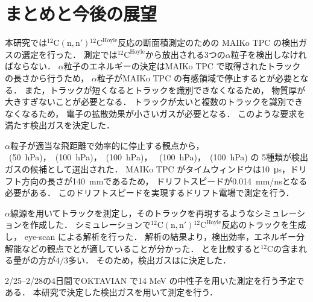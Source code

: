 \documentclass[../master]{subfiles}
\begin{document}
\chapter{まとめと今後の展望}
本研究では${}^{12}\mathrm{C}(\mathrm{n}, \mathrm{n}'){}^{12}\mathrm{C}^{\text{Hoyle}}$反応の断面積測定のための
MAIKo TPC の検出ガスの選定を行った．
測定では${}^{12}\mathrm{C}^{\text{Hoyle}}$から放出される3つの$\alpha$粒子を検出しなければならない．
$\alpha$粒子のエネルギーの決定はMAIKo TPC で取得されたトラックの長さから行うため，
$\alpha$粒子がMAIKo TPC の有感領域で停止するとが必要となる．
また，トラックが短くなるとトラックを識別できなくなるため，
物質厚が大きすぎないことが必要となる．
トラックが太いと複数のトラックを識別できなくなるため，
電子の拡散効果が小さいガスが必要となる．
このような要求を満たす検出ガスを決定した．

$\alpha$粒子が適当な飛距離で効率的に停止する観点から，
\Methane~(\SI{50}{\hecto\pascal})，\MethaneHydro~(\SI{100}{\hecto\pascal})，\MethaneHerium~(\SI{100}{\hecto\pascal})，
\isoButaneHydro~(\SI{100}{\hecto\pascal})，\isoButaneHerium~(\SI{100}{\hecto\pascal}) の
5種類が検出ガスの候補として選出された．
MAIKo TPC がタイムウィンドウは\SI{10}{\micro\second}，ドリフト方向の長さが\SI{140}{\milli\metre}であるため，
ドリフトスピードが\SI{0.014}{\milli\metre/\nano\second}となる必要がある．
このドリフトスピードを実現するドリフト電場で測定を行う．

$\alpha$線源を用いてトラックを測定し，そのトラックを再現するようなシミュレーションを作成した．
シミュレーションで${}^{12}\mathrm{C}(\mathrm{n}, \mathrm{n}'){}^{12}\mathrm{C}^{\text{Hoyle}}$反応のトラックを生成し，
eye-scan による解析を行った．
解析の結果より，検出効率，エネルギー分解能などの観点で\MethaneHydro と\isoButaneHydro が適していることが分かった．
\MethaneHydro と\isoButaneHydro を比較すると${}^{12}\mathrm{C}$の含まれる量が\isoButaneHydro の方が$4/3$多い．
そのため，検出ガスは\isoButaneHydro に決定した．

2/25--2/28の4日間でOKTAVIAN で14 MeV の中性子を用いた測定を行う予定である．
本研究で決定した検出ガスを用いて測定を行う．
\end{document}
